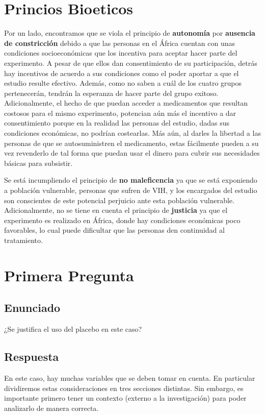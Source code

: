 \documentclass{report}
\begin{document}
\chapter{Princios Bioeticos}
Por un lado, encontramos que se viola el principio de \textbf{autonomía} por \textbf{ausencia de constricción} debido a que las personas en el África cuentan con unas condiciones socioeconómicas que los incentiva para aceptar hacer parte del experimento. A pesar de que ellos dan consentimiento de su participación, detrás hay incentivos de acuerdo a sus condiciones como el poder aportar a que el estudio resulte efectivo. Además, como no saben a cuál de los cuatro grupos pertenecerán, tendrán la esperanza de hacer parte del grupo exitoso. Adicionalmente, el hecho de que puedan acceder a medicamentos que resultan costosos para el mismo experimento, potencian aún más el incentivo a dar consentimiento porque en la realidad las personas del estudio, dadas sus condiciones económicas, no podrían costearlas. Más aún, al darles la libertad a las personas de que se autosuministren el medicamento, estas fácilmente pueden a su vez revenderlo de tal forma que puedan usar el dinero para cubrir sus necesidades básicas para subsistir. 

Se está incumpliendo el principio de \textbf{no maleficencia} ya que se está exponiendo a población vulnerable, personas que sufren de VIH, y los encargados del estudio son conscientes de este potencial perjuicio ante esta población vulnerable. Adicionalmente, no se tiene en cuenta el principio de \textbf{justicia} ya que el experimento es realizado en África, donde hay condiciones económicas poco favorables, lo cual puede dificultar que las personas den continuidad al tratamiento.


\chapter{Primera Pregunta}
\section*{Enunciado}
¿Se justifica el uso del placebo en este caso?

\section*{Respuesta}

En este caso, hay muchas variables que se deben tomar en cuenta. En particular dividiremos estas consideraciones en tres secciones distintas. Sin embargo, es importante primero tener un contexto (externo a la investigación) para poder analizarlo de manera correcta.
\end{document}
